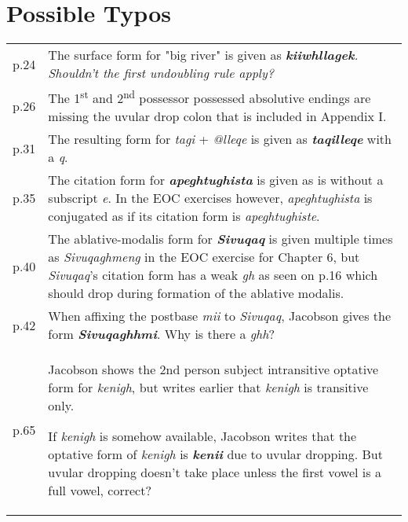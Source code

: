 \documentclass{article}
\begin{document}
\section{Possible Typos}

\begin{tabular}{p{1cm}p{10.5cm}}
p.24 & The surface form for "big river" is given as \textit{\textbf{kiiwhllagek}. Shouldn't the first undoubling rule apply?} \\

p.26 & The 1\textsuperscript{st} and 2\textsuperscript{nd} possessor possessed absolutive endings are missing the uvular drop colon that is included in Appendix I. \\

p.31 & The resulting form for \textit{tagi} + \textit{@lleqe} is given as \textit{\textbf{taqilleqe}} with a \textit{q}. \\

p.35 & The citation form for \textit{\textbf{apeghtughista}} is given as is without a subscript \textit{e}. In the EOC exercises however, \textit{apeghtughista} is conjugated as if its citation form is \textit{apeghtughiste}. \\

p.40 & The ablative-modalis form for \textit{\textbf{Sivuqaq}} is given multiple times as \textit{Sivuqaghmeng} in the EOC exercise for Chapter 6, but \textit{Sivuqaq}'s citation form has a weak \textit{gh} as seen on p.16 which should drop during formation of the ablative modalis.\\

p.42 & When affixing the postbase \textit{mii} to \textit{Sivuqaq}, Jacobson gives the form \textit{\textbf{Sivuqaghhmi}}.
%
Why is there a \textit{ghh}? \\

p.65 & 	Jacobson shows the 2nd person subject intransitive optative form for \textit{kenigh}, but writes earlier that \textit{kenigh} is transitive only.

If \textit{kenigh} is somehow available, Jacobson writes that the optative form of \textit{kenigh} is \textit{\textbf{kenii}} due to uvular dropping.
%
But uvular dropping doesn't take place unless the first vowel is a full vowel, correct?

\end{tabular}
\end{document}
